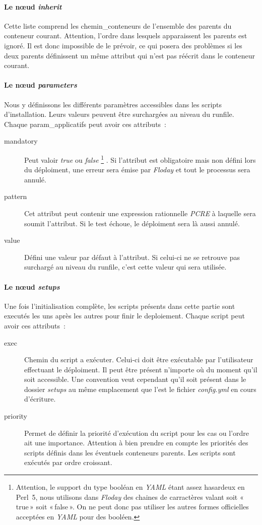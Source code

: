 \paragraph{Le nœud \emph{inherit}}
Cette liste comprend les \glspl{chemin_conteneur} de l'ensemble des parents du conteneur courant.
Attention, l'ordre dans lesquels apparaissent les parents est ignoré.
Il est donc impossible de le prévoir, ce qui posera des problèmes si les deux parents définissent un même \gls{attribut}  qui n'est pas réécrit dans le conteneur courant.

\paragraph{Le nœud \emph{parameters}}
Nous y définissons les différents paramètres accessibles dans les scripts d'installation. Leurs valeurs peuvent être surchargées au niveau du \gls{runfile}.
Chaque \gls{param_applicatifs} peut avoir ces attributs~:
\begin{description}
	\item[mandatory] Peut valoir \emph{true} ou \emph{false}%
		\footnote{Attention, le support du type booléan en \emph{YAML} étant assez hasardeux en Perl~5, nous utilisons dans \emph{Floday} des chaines de carractères valant soit «\,true\,» soit «\,false\,». On ne peut donc pas utiliser les autres formes officielles acceptées en \emph{YAML} pour des booléen.}%
		. Si l'attribut est obligatoire mais non défini lors du déploiment, une erreur sera émise par \emph{Floday} et tout le processus sera annulé.
	\item[pattern] Cet attribut peut contenir une expression rationnelle \emph{PCRE} à laquelle sera soumit l'attribut. Si le test échoue, le déploiment sera là aussi annulé.
	\item[value] Défini une valeur par défaut à l'attribut. Si celui-ci ne se retrouve pas surchargé au niveau du \gls{runfile}, c'est cette valeur qui sera utilisée.
\end{description}

\paragraph{Le nœud \emph{setups}}
Une fois l'\gls{initialisation} complète, les scripts présents dans cette partie sont executés les uns après les autres pour finir le \gls{deploiement}.
Chaque script peut avoir ces attributs~:
\begin{description}
	\item[exec] Chemin du script a exécuter. Celui-ci doit être exécutable par l'utilisateur effectuant le déploiment. Il peut être présent n'importe où du moment qu'il soit accessible. Une convention veut cependant qu'il soit présent dans le dossier \emph{setups} au même emplacement que l'est le fichier \emph{config.yml} en cours d'écriture.
	\item[priority] Permet de définir la priorité d'exécution du script pour les cas ou l'ordre ait une importance. Attention à bien prendre en compte les priorités des scripts définis dans les éventuels conteneurs parents. Les scripts sont exécutés par ordre croissant.
\end{description}

